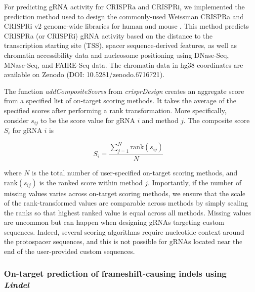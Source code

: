 \documentclass[pdftex,english,10pt]{article}
\begin{document}
For predicting gRNA activity for CRISPRa and CRISPRi, we implemented the prediction method used to design the commonly-used Weissman CRISPRa and CRISPRi v2 genome-wide libraries for human and mouse \citep{crispria}.
This method predicts CRISPRa (or CRISPRi) gRNA activity based on the distance to the transcription starting site (TSS), spacer sequence-derived features, as well as chromatin accessibility data and nucleosome positioning using DNase-Seq, MNase-Seq, and FAIRE-Seq data. The chromatin data in hg38 coordinates are available on Zenodo (DOI: 10.5281/zenodo.6716721).

The function \textit{addCompositeScores} from \textit{crisprDesign} creates an aggregate score from a specified list of on-target scoring methods. It takes the average of the specified scores after performing a rank transformation. More specifically, consider $s_{ij}$ to be the score value for gRNA $i$ and method $j$. The composite score $S_{i}$ for gRNA $i$ is

\begin{equation}
S_{i} = \frac{\sum_{j = 1}^N \text{rank}(s_{ij})}{N}
\end{equation}

where $N$ is the total number of user-specified on-target scoring methods, and $\text{rank}(s_{ij})$ is the ranked score within method $j$. Importantly, if the number of missing values varies across on-target scoring methods, we ensure that the scale of the rank-transformed values are comparable across methods by simply scaling the ranks so that highest ranked value is equal across all methods. Missing values are uncommon but can happen when designing gRNAs targeting custom sequences. Indeed, several scoring algorithms require nucleotide context around the protospacer sequences, and this is not possible for gRNAs located near the end of the user-provided custom sequences. 


\subsubsection*{On-target prediction of frameshift-causing indels using \textit{Lindel}}
\end{document}
